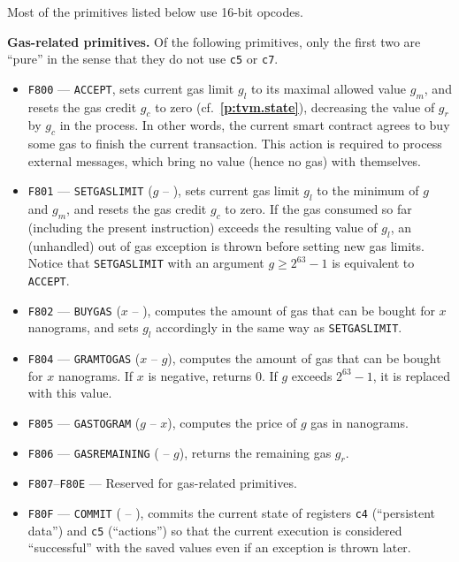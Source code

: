 \documentclass[12pt,oneside]{article}
\def\makepoint#1{\medbreak\noindent{\bf #1.\ }}
\def\nxsubpoint{\refstepcounter{subsubsection}%
  \smallbreak\makepoint{\thesubsubsection}}
\def\refpoint#1{{\rm\textbf{\ref{#1}}}}
\let\ptref=\refpoint
\def\emb#1{\textbf{#1.}}
\begin{document}
Most of the primitives listed below use 16-bit opcodes.

\nxsubpoint\emb{Gas-related primitives}
Of the following primitives, only the first two are ``pure'' in the sense that they do not use {\tt c5} or {\tt c7}.
\begin{itemize}
\item {\tt F800} --- {\tt ACCEPT}, sets current gas limit $g_l$ to its maximal allowed value $g_m$, and resets the gas credit $g_c$ to zero (cf.~\ptref{p:tvm.state}), decreasing the value of $g_r$ by $g_c$ in the process. In other words, the current smart contract agrees to buy some gas to finish the current transaction. This action is required to process external messages, which bring no value (hence no gas) with themselves.
\item {\tt F801} --- {\tt SETGASLIMIT} ($g$ -- ), sets current gas limit $g_l$ to the minimum of $g$ and $g_m$, and resets the gas credit $g_c$ to zero. If the gas consumed so far (including the present instruction) exceeds the resulting value of $g_l$, an (unhandled) out of gas exception is thrown before setting new gas limits. Notice that {\tt SETGASLIMIT} with an argument $g\geq 2^{63}-1$ is equivalent to {\tt ACCEPT}.
\item {\tt F802} --- {\tt BUYGAS} ($x$ -- ), computes the amount of gas that can be bought for $x$ nanograms, and sets $g_l$ accordingly in the same way as {\tt SETGASLIMIT}.
\item {\tt F804} --- {\tt GRAMTOGAS} ($x$ -- $g$), computes the amount of gas that can be bought for $x$ nanograms. If $x$ is negative, returns 0. If $g$ exceeds $2^{63}-1$, it is replaced with this value.
\item {\tt F805} --- {\tt GASTOGRAM} ($g$ -- $x$), computes the price of $g$ gas in nanograms.
\item {\tt F806} --- {\tt GASREMAINING} ( -- $g$), returns the remaining gas $g_r$.
\item {\tt F807}--{\tt F80E} --- Reserved for gas-related primitives.
\item {\tt F80F} --- {\tt COMMIT} ( -- ), commits the current state of registers {\tt c4} (``persistent data'') and {\tt c5} (``actions'') so that the current execution is considered ``successful'' with the saved values even if an exception is thrown later.
\end{itemize}
\end{document}
